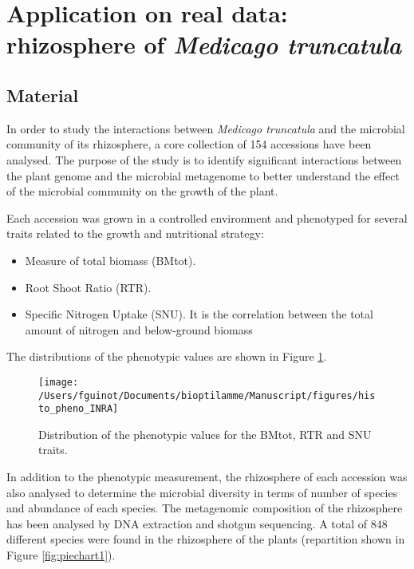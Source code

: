 \documentclass[]{book}
\begin{document}
\hypertarget{XPINRA}{%
\section{\texorpdfstring{Application on real data: rhizosphere of \emph{Medicago truncatula}}{Application on real data: rhizosphere of Medicago truncatula}}\label{XPINRA}}

\hypertarget{material}{%
\subsection{Material}\label{material}}

In order to study the interactions between \emph{Medicago truncatula} and the
microbial community of its rhizosphere, a core collection of 154
accessions have been analysed. The purpose of the study is to identify
significant interactions between the plant genome and the microbial
metagenome to better understand the effect of the microbial community on
the growth of the plant.

Each accession was grown in a controlled environment and phenotyped for
several traits related to the growth and nutritional strategy:

\begin{itemize}
\item
  Measure of total biomass (BMtot).
\item
  Root Shoot Ratio (RTR).
\item
  Specific Nitrogen Uptake (SNU). It is the correlation between the
  total amount of nitrogen and below-ground biomass
\end{itemize}

The distributions of the phenotypic values are shown in Figure
\ref{fig:histopheno}.



\begin{figure}

{\centering \texttt{[image: /Users/fguinot/Documents/bioptilamme/Manuscript/figures/histo\_pheno\_INRA]} 

}

\caption{Distribution of the phenotypic values for the BMtot, RTR and SNU traits.}\label{fig:histopheno}
\end{figure}

In addition to the phenotypic measurement, the rhizosphere of each
accession was also analysed to determine the microbial diversity in
terms of number of species and abundance of each species. The
metagenomic composition of the rhizosphere has been analysed by DNA
extraction and shotgun sequencing. A total of 848 different species were
found in the rhizosphere of the plants (repartition shown in Figure
\ref{fig:piechart1}).
\end{document}

